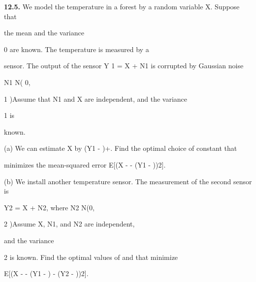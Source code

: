\textbf{12.5.} We model the temperature in a forest by a random variable X. Suppose that

the mean \mu and the variance 

0 are known. The temperature is measured by a

sensor. The output of the sensor Y 1 = X + N1 is corrupted by Gaussian noise

N1 N( 0,

1 )Assume that N1 and X are independent, and the variance 

1 is

known.

(a) We can estimate X by \alpha(Y1 - \mu)+\mu. Find the optimal choice of constant \alpha that

minimizes the mean-squared error E[(X - \mu - \alpha(Y1 - \mu))2].

(b) We install another temperature sensor. The measurement of the second sensor is

Y2 = X + N2, where N2 N(0,

2 )Assume X, N1, and N2 are independent,

and the variance 

2 is known. Find the optimal values of \alpha and \beta that minimize

E[(X - \mu - \alpha(Y1 - \mu) - \beta(Y2 - \mu))2].
